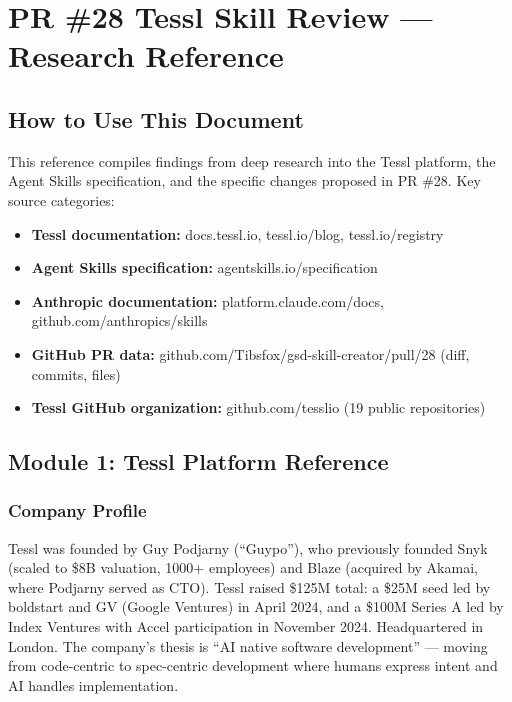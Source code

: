 \documentclass[11pt,letterpaper]{article}
\begin{document}
\section{PR \#28 Tessl Skill Review --- Research Reference}

\subsection{How to Use This Document}

This reference compiles findings from deep research into the Tessl platform, the Agent Skills specification, and the specific changes proposed in PR \#28. Key source categories:

\begin{itemize}[leftmargin=2em]
\item \textbf{Tessl documentation:} docs.tessl.io, tessl.io/blog, tessl.io/registry
\item \textbf{Agent Skills specification:} agentskills.io/specification
\item \textbf{Anthropic documentation:} platform.claude.com/docs, github.com/anthropics/skills
\item \textbf{GitHub PR data:} github.com/Tibsfox/gsd-skill-creator/pull/28 (diff, commits, files)
\item \textbf{Tessl GitHub organization:} github.com/tesslio (19 public repositories)
\end{itemize}

\subsection{Module 1: Tessl Platform Reference}

\subsubsection{Company Profile}

Tessl was founded by Guy Podjarny (``Guypo''), who previously founded Snyk (scaled to \$8B valuation, 1000+ employees) and Blaze (acquired by Akamai, where Podjarny served as CTO). Tessl raised \$125M total: a \$25M seed led by boldstart and GV (Google Ventures) in April 2024, and a \$100M Series A led by Index Ventures with Accel participation in November 2024. Headquartered in London. The company's thesis is ``AI native software development'' --- moving from code-centric to spec-centric development where humans express intent and AI handles implementation.
\end{document}
